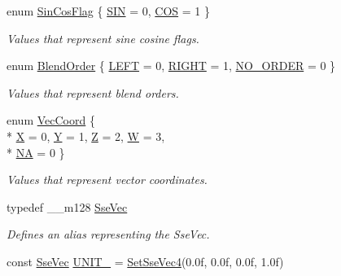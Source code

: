 \begin{DoxyCompactItemize}
\item 
enum \hyperlink{namespacegfxmath_ac97be114298a04e9db7f993085667b00}{Sin\+Cos\+Flag} \{ \hyperlink{namespacegfxmath_ac97be114298a04e9db7f993085667b00ac25dc94e5f333f4dc6ead2b93687bfcc}{S\+I\+N} = 0, 
\hyperlink{namespacegfxmath_ac97be114298a04e9db7f993085667b00a46197a43f8fe8efbdae8c2670975d2e7}{C\+O\+S} = 1
 \}
\begin{DoxyCompactList}\small\item\em Values that represent sine cosine flags. \end{DoxyCompactList}\item 
enum \hyperlink{namespacegfxmath_ac03f836d004dbed0f2219c54b8e63e3d}{Blend\+Order} \{ \hyperlink{namespacegfxmath_ac03f836d004dbed0f2219c54b8e63e3da48d2a91c97bb0e96285fd218fbd098f5}{L\+E\+F\+T} = 0, 
\hyperlink{namespacegfxmath_ac03f836d004dbed0f2219c54b8e63e3da28dcb685e33dd6cc73f168dbf003894e}{R\+I\+G\+H\+T} = 1, 
\hyperlink{namespacegfxmath_ac03f836d004dbed0f2219c54b8e63e3da631e9eab7013501bd492e4730e793d27}{N\+O\+\_\+\+O\+R\+D\+E\+R} = 0
 \}
\begin{DoxyCompactList}\small\item\em Values that represent blend orders. \end{DoxyCompactList}\item 
enum \hyperlink{namespacegfxmath_a8930e63e96e91796ede30a8378b19d0b}{Vec\+Coord} \{ \\*
\hyperlink{namespacegfxmath_a8930e63e96e91796ede30a8378b19d0bad0d09e689002558ad9843a534c0be86e}{X} = 0, 
\hyperlink{namespacegfxmath_a8930e63e96e91796ede30a8378b19d0badd0e5340138dca954913bc9378f1c228}{Y} = 1, 
\hyperlink{namespacegfxmath_a8930e63e96e91796ede30a8378b19d0ba15f9e08071113483f5106cf0ba08e502}{Z} = 2, 
\hyperlink{namespacegfxmath_a8930e63e96e91796ede30a8378b19d0ba9589e88a1f2f02c189304aab6a2629f2}{W} = 3, 
\\*
\hyperlink{namespacegfxmath_a8930e63e96e91796ede30a8378b19d0baa2f2f53ce2dc4111dbf16ba3d31692f7}{N\+A} = 0
 \}
\begin{DoxyCompactList}\small\item\em Values that represent vector coordinates. \end{DoxyCompactList}\item 
typedef \+\_\+\+\_\+m128 \hyperlink{namespacegfxmath_a0de2243e2b8d0fd46d3af5e036423004}{Sse\+Vec}
\begin{DoxyCompactList}\small\item\em Defines an alias representing the Sse\+Vec. \end{DoxyCompactList}\item 
\hypertarget{namespacegfxmath_a6994d7f14c150c61f588662f00d0c8ff}{}const \hyperlink{namespacegfxmath_a0de2243e2b8d0fd46d3af5e036423004}{Sse\+Vec} \hyperlink{namespacegfxmath_a6994d7f14c150c61f588662f00d0c8ff}{U\+N\+I\+T\+\_} = \hyperlink{namespacegfxmath_a3b21a4362c6ac781c5f6ab922840ba77}{Set\+Sse\+Vec4}(0.\+0f, 0.\+0f, 0.\+0f, 1.\+0f)\label{namespacegfxmath_a6994d7f14c150c61f588662f00d0c8ff}


\end{DoxyCompactItemize}
